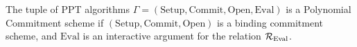 \begin{definition}
\label{polynomial-commitment}
The tuple of PPT algorithms $\Gamma = (\mathrm{Setup}, \mathrm{Commit}, \mathrm{Open}, \mathrm{Eval})$ is a Polynomial Commitment scheme if $(\mathrm{Setup}, \mathrm{Commit}, \mathrm{Open})$ is a binding commitment scheme, and $\mathrm{Eval}$ is an interactive argument for the relation $\mathcal{R}_{\mathrm{Eval}}$.
\end{definition}


